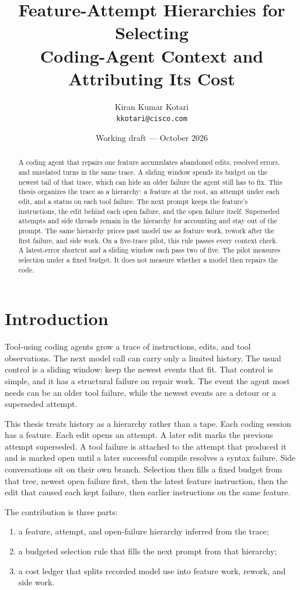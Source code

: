 \documentclass[11pt]{article}
\title{Feature-Attempt Hierarchies for Selecting\\ Coding-Agent Context and Attributing Its Cost}
\author{Kiran Kumar Kotari\\ \texttt{kkotari@cisco.com}}
\date{Working draft --- October 2026}
\begin{document}
\maketitle

\begin{abstract}
A coding agent that repairs one feature accumulates abandoned edits, resolved errors, and unrelated turns in the same trace.
A sliding window spends its budget on the newest tail of that trace, which can hide an older failure the agent still has to fix.
This thesis organizes the trace as a hierarchy: a feature at the root, an attempt under each edit, and a status on each tool failure.
The next prompt keeps the feature's instructions, the edit behind each open failure, and the open failure itself.
Superseded attempts and side threads remain in the hierarchy for accounting and stay out of the prompt.
The same hierarchy prices past model use as feature work, rework after the first failure, and side work.
On a five-trace pilot, this rule passes every context check.
A latest-error shortcut and a sliding window each pass two of five.
The pilot measures selection under a fixed budget.
It does not measure whether a model then repairs the code.
\end{abstract}

\section{Introduction}

Tool-using coding agents grow a trace of instructions, edits, and tool observations.
The next model call can carry only a limited history.
The usual control is a sliding window: keep the newest events that fit.
That control is simple, and it has a structural failure on repair work.
The event the agent most needs can be an older tool failure, while the newest events are a detour or a superseded attempt.

This thesis treats history as a hierarchy rather than a tape.
Each coding session has a feature.
Each edit opens an attempt.
A later edit marks the previous attempt superseded.
A tool failure is attached to the attempt that produced it and is marked open until a later successful compile resolves a syntax failure.
Side conversations sit on their own branch.
Selection then fills a fixed budget from that tree, newest open failure first, then the latest feature instruction, then the edit that caused each kept failure, then earlier instructions on the same feature.

The contribution is three parts:
\begin{enumerate}
  \item a feature, attempt, and open-failure hierarchy inferred from the trace;
  \item a budgeted selection rule that fills the next prompt from that hierarchy;
  \item a cost ledger that splits recorded model use into feature work, rework, and side work.
\end{enumerate}
\end{document}
